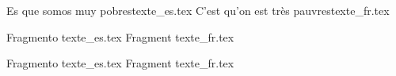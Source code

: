 \documentclass[a5paper]{book}
\begin{document}

%
{Es que somos muy pobres}{texte_es.tex}%
{C'est qu'on est très pauvres}{texte_fr.tex}

%
{Fragmento }{texte_es.tex}%
{Fragment }{texte_fr.tex}

%
{Fragmento }{texte_es.tex}%
{Fragment }{texte_fr.tex}
\end{document}
